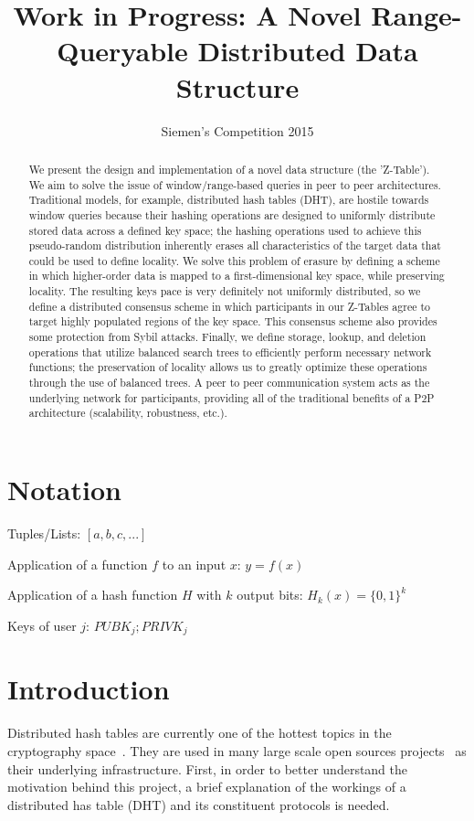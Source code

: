\documentclass[12pt]{IEEEtran}
\title{Work in Progress: A Novel Range-Queryable Distributed Data Structure}
\author{Siemen's Competition 2015}
\date{\vspace{-5ex}}
\begin{document}
\maketitle

\begin{abstract}
We present the design and implementation of a novel data structure (the 'Z-Table'). We aim to solve the issue of window/range-based queries in peer to peer architectures. Traditional models, for example,  distributed hash tables (DHT), are hostile towards window queries because their hashing operations are designed to uniformly distribute stored data across a defined key space; the hashing operations used to achieve this pseudo-random distribution inherently erases all characteristics of the target data that could be used to define locality. We solve this problem of erasure by defining a scheme in which higher-order data is mapped to a first-dimensional key space, while preserving locality. The resulting keys pace is very definitely not uniformly distributed, so we define a distributed consensus scheme in which participants in our Z-Tables agree to target highly populated regions of the key space. This consensus scheme also provides some protection from Sybil attacks. Finally, we define storage, lookup, and deletion operations that utilize balanced search trees to efficiently perform necessary network functions; the preservation of locality allows us to greatly optimize these operations through the use of balanced trees. A peer to peer communication system acts as the underlying network for participants, providing all of the traditional benefits of a P2P architecture (scalability, robustness, etc.).
\end{abstract}


\section{Notation}

\noindent Tuples/Lists: $[a,b,c,...]$

\noindent Application of a function $f$ to an input $x$: $y=f(x)$

\noindent Application of a hash function $H$ with $k$ output bits: $H_{k}(x) = \{0,1\}^k$

\noindent Keys of user $j$: $ PUBK_j; PRIVK_j $


\section{Introduction}
\par Distributed hash tables are currently one of the hottest topics in the cryptography space~\cite{Stoica:2001dj,Rowstron:2001ea,Ratnasamy:2001wn}. They are used in many large scale open sources projects~\cite{Freitas:2013tb,Xu:2010vs,Perfitt:2010fh} as their underlying infrastructure. First, in order to better understand the motivation behind this project, a brief explanation of the workings of a distributed has table (DHT) and its constituent protocols is needed.
\end{document}
